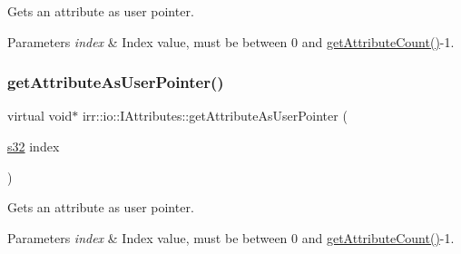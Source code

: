 Gets an attribute as user pointer. 


\begin{DoxyParams}{Parameters}
{\em index} & Index value, must be between 0 and \hyperlink{classirr_1_1io_1_1IAttributes_a796bdd9440ee7ba0b6742a90a82870b6}{get\+Attribute\+Count()}-\/1. \\
\hline
\end{DoxyParams}
\mbox{\label{classirr_1_1io_1_1IAttributes_ae720da1bc66bc535ab839e95018d7398}} 
\subsubsection{\texorpdfstring{get\+Attribute\+As\+User\+Pointer()}{getAttributeAsUserPointer()}\hspace{0.1cm}{\footnotesize\ttfamily [4/4]}}
{\footnotesize\ttfamily virtual void$\ast$ irr\+::io\+::\+I\+Attributes\+::get\+Attribute\+As\+User\+Pointer (\begin{DoxyParamCaption}\item[{\hyperlink{namespaceirr_ac66849b7a6ed16e30ebede579f9b47c6}{s32}}]{index }\end{DoxyParamCaption})\hspace{0.3cm}{\ttfamily [pure virtual]}}



Gets an attribute as user pointer. 


\begin{DoxyParams}{Parameters}
{\em index} & Index value, must be between 0 and \hyperlink{classirr_1_1io_1_1IAttributes_a796bdd9440ee7ba0b6742a90a82870b6}{get\+Attribute\+Count()}-\/1. \\
\hline
\end{DoxyParams}
\mbox{\label{classirr_1_1io_1_1IAttributes_a047461734c2eb9e3f1b68a4278a0d24b}} 
